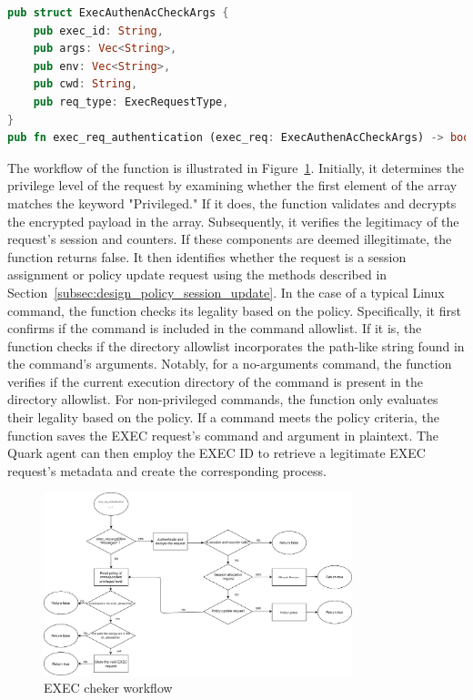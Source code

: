 \begin{lstlisting}[language=rust, caption= API of EXEC checker, label={lst:exec_Cheker}]
pub struct ExecAuthenAcCheckArgs {
    pub exec_id: String,
    pub args: Vec<String>,
    pub env: Vec<String>,
    pub cwd: String,
    pub req_type: ExecRequestType,
}
pub fn exec_req_authentication (exec_req: ExecAuthenAcCheckArgs) -> bool
\end{lstlisting}

The workflow of the function is illustrated in Figure~\ref{fig:exec_req_authentication_flow_chart}. Initially, it determines the privilege level of the request by examining whether the first element of the array matches the keyword "Privileged." If it does, the function validates and decrypts the 
encrypted payload in the array. Subsequently, it verifies the legitimacy of the request's session and counters. If these components are deemed illegitimate, the function returns false. It then identifies whether the request is a session assignment or policy update request using the methods described 
in Section~\ref{subsec:design_policy_session_update}. In the case of a typical Linux command, the function checks its legality based on the policy. Specifically, it first confirms if the command is included in the command allowlist. If it is, the function checks if the directory allowlist incorporates the path-like string found in the 
command's arguments. Notably, for a no-arguments command, the function verifies if the current execution directory of the command is present in the directory allowlist. For non-privileged commands, the function only evaluates their legality based on the policy. If a command meets the policy criteria, 
the function saves the EXEC request's command and argument in plaintext. The Quark agent can then employ the EXEC ID to retrieve a legitimate EXEC request's metadata and create the corresponding process.

\begin{figure}[!htb]
    \centering
    \includegraphics[width=0.8\textwidth]{images/exec_req_authentication_flow_chart.png}
    \caption[EXEC cheker workflow]{EXEC cheker workflow}
    \label{fig:exec_req_authentication_flow_chart}
\end{figure}

